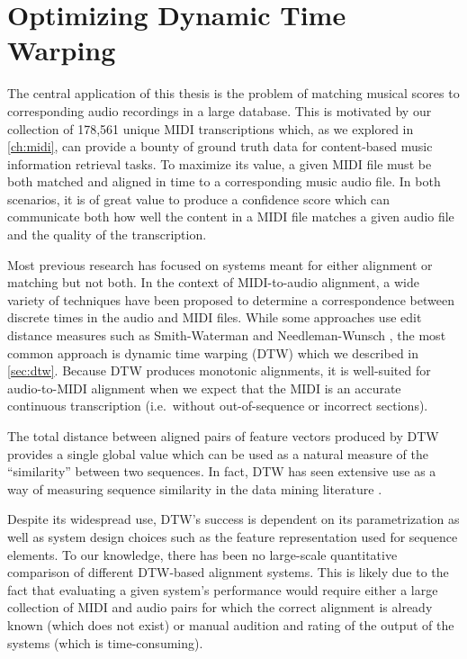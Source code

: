 \chapter{Optimizing Dynamic Time Warping}
\label{ch:dtw}

The central application of this thesis is the problem of matching musical scores to corresponding audio recordings in a large database.
This is motivated by our collection of 178,561 unique MIDI transcriptions which, as we explored in \cref{ch:midi}, can provide a bounty of ground truth data for content-based music information retrieval tasks.
To maximize its value, a given MIDI file must be both matched and aligned in time to a corresponding music audio file.
In both scenarios, it is of great value to produce a confidence score which can communicate both how well the content in a MIDI file matches a given audio file and the quality of the transcription.

Most previous research has focused on systems meant for either alignment or matching but not both.
In the context of MIDI-to-audio alignment, a wide variety of techniques have been proposed to determine a correspondence between discrete times in the audio and MIDI files.
While some approaches use edit distance measures such as Smith-Waterman \cite{ewert2012towards} and Needleman-Wunsch \cite{grachten2013automatic}, the most common approach is dynamic time warping (DTW) which we described in \cref{sec:dtw}.
Because DTW produces monotonic alignments, it is well-suited for audio-to-MIDI alignment when we expect that the MIDI is an accurate continuous transcription (i.e.\ without out-of-sequence or incorrect sections).

The total distance between aligned pairs of feature vectors produced by DTW provides a single global value which can be used as a natural measure of the ``similarity'' between two sequences.
In fact, DTW has seen extensive use as a way of measuring sequence similarity in the data mining literature \cite{berndt1994using}.

Despite its widespread use, DTW's success is dependent on its parametrization as well as system design choices such as the feature representation used for sequence elements.
To our knowledge, there has been no large-scale quantitative comparison of different DTW-based alignment systems.
This is likely due to the fact that evaluating a given system's performance would require either a large collection of MIDI and audio pairs for which the correct alignment is already known (which does not exist) or manual audition and rating of the output of the systems (which is time-consuming).

